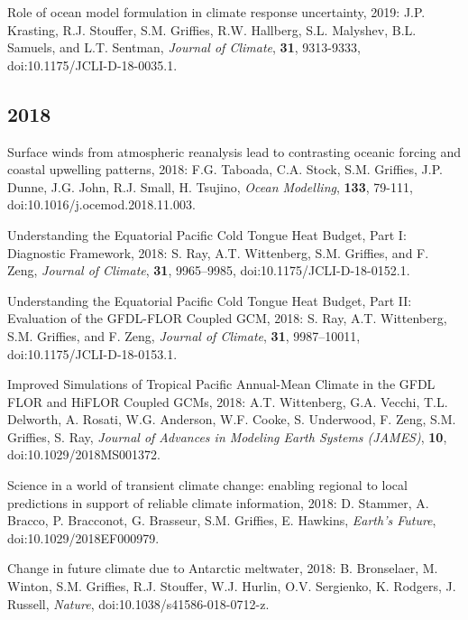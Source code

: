 \begin{etaremune}
\item Role of ocean model formulation in climate response uncertainty, 2019: J.P. Krasting, R.J. Stouffer, S.M. Grif\/f\/ies, R.W. Hallberg, S.L. Malyshev, B.L. Samuels, and L.T. Sentman, {\it Journal of Climate}, {\bf 31}, 9313-9333, doi:10.1175/JCLI-D-18-0035.1.

\subsection*{\sc \color{Maroon} 2018}


\item Surface winds from atmospheric reanalysis lead to contrasting oceanic forcing and coastal upwelling patterns, 2018: F.G. Taboada, C.A. Stock, S.M. Grif\/f\/ies, J.P. Dunne, J.G. John, R.J. Small, H. Tsujino, {\it Ocean Modelling}, {\bf 133}, 79-111, 
doi:10.1016/j.ocemod.2018.11.003.

\item Understanding the Equatorial Pacific Cold Tongue Heat Budget, Part I: Diagnostic Framework, 2018: S. Ray, A.T. Wittenberg, S.M. Grif\/f\/ies, and F. Zeng, {\it Journal of Climate}, {\bf 31}, 9965--9985, doi:10.1175/JCLI-D-18-0152.1. 

\item Understanding the Equatorial Pacific Cold Tongue Heat Budget, Part II: Evaluation of the GFDL-FLOR Coupled GCM, 2018: S. Ray, A.T. Wittenberg, S.M. Grif\/f\/ies, and F. Zeng, {\it Journal of Climate}, {\bf 31}, 9987--10011, doi:10.1175/JCLI-D-18-0153.1.

\item Improved Simulations of Tropical Pacific Annual-Mean Climate in the GFDL FLOR and HiFLOR Coupled GCMs, 2018:  A.T. Wittenberg, G.A. Vecchi, T.L. Delworth, A. Rosati, W.G. Anderson, W.F. Cooke, S. Underwood, F. Zeng, S.M. Grif\/f\/ies, S. Ray, {\it Journal of Advances in Modeling Earth Systems (JAMES)}, {\bf 10}, doi:10.1029/2018MS001372. 

\item Science in a world of transient climate change: enabling regional to local predictions in support of reliable climate information, 2018: D. Stammer, A. Bracco, P. Bracconot, G. Brasseur, S.M. Grif\/f\/ies, E. Hawkins, {\it Earth's Future}, \\ doi:10.1029/2018EF000979.

\item Change in future climate due to Antarctic meltwater, 2018: B. Bronselaer, M. Winton, S.M. Grif\/f\/ies, R.J. Stouffer, W.J. Hurlin, O.V. Sergienko, K. Rodgers, J. Russell, {\it  Nature}, doi:10.1038/s41586-018-0712-z.


\end{etaremune}
